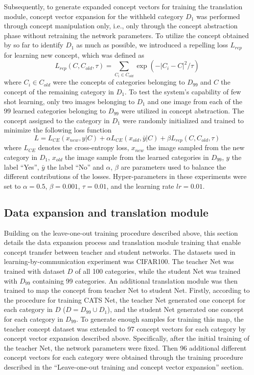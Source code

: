 \documentclass[pdflatex,sn-mathphys-num,lineno]{sn-jnl}%
\begin{document}
\begin{CJK}{UTF8}{gbsn}
Subsequently, to generate expanded concept vectors for training the translation module, concept vector expansion for the withheld category $D_1$ was performed through concept manipulation only, i.e., only through the concept abstraction phase without retraining the network parameters. To utilize the concept obtained by so far to identify $D_1$ as much as possible, we introduced a repelling loss $L_{rep}$ for learning new concept, which was defined as
\[
L_{rep}(C, C_{old}, \tau) = \sum_{C_i \in C_{old}} \exp (-|C_i - C|^2/\tau)
\]
where $C_i \in C_{old}$ were the concepts of categories belonging to $D_{99}$ and $C$ the concept of the remaining category in $D_1$. To test the system’s capability of few shot learning, only two images belonging to $D_1$ and one image from each of the $99$ learned categories belonging to $D_{99}$ were utilized in concept abstraction. The concept assigned to the category in $D_1$ were randomly initialized and trained to minimize the following loss function
\[
L = L_{CE}(x_{new},y|C) + \alpha L_{CE}(x_{old},\bar{y}|C) + \beta L_{rep}(C, C_{old}, \tau)
\]
where $L_{CE}$ denotes the cross-entropy loss, $x_{new}$ the image sampled from the new category in $D_1$, $x_{old}$ the image sample from the learned categories in $D_{99}$, $y$ the label “Yes”, $\bar{y}$ the label “No” and $\alpha$, $\beta$ are parameters used to balance the different contributions of the losses. Hyper-parameters in these experiments were set to $\alpha = 0.5$, $\beta = 0.001$, $\tau = 0.01$, and the learning rate $ lr = 0.01$. 

\subsection{Data expansion and translation module}
Building on the leave-one-out training procedure described above, this section details the data expansion process and translation module training that enable concept transfer between teacher and student networks. The datasets used in learning-by-communication experiment was CIFAR100. The teacher Net was trained with dataset $D$ of all 100 categories, while the student Net was trained with $D_{99}$ containing 99 categories. An additional translation module was then trained to map the concept from teacher Net to student Net. Firstly, according to the procedure for training CATS Net, the teacher Net generated one concept for each category in $D$ ($D = D_{99} \cup D_1$), and the student Net generated one concept for each category in $D_{99}$. To generate enough samples for training this map, the teacher concept dataset was extended to 97 concept vectors for each category by concept vector expansion described above. Specifically, after the initial training of the teacher Net, the network parameters were fixed. Then 96 additional different concept vectors for each category were obtained through the training procedure described in the “Leave-one-out training and concept vector expansion” section. 


\end{CJK}
\end{document}
